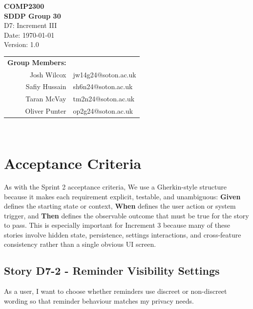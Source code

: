 \documentclass[a4paper, 12pt]{article}
\begin{document}
    \pagestyle{empty}

    \begin{titlepage}
        \centering
        \vspace*{2cm}
        {\Huge \textbf{COMP2300}}\\[1cm]
        {\LARGE \textbf{SDDP Group 30}}\\[0.5cm]
        {\Large D7: Increment III}\\[1cm]
        {\large Date: \today}\\[0.2cm]
        {\large Version: 1.0}\\[1cm]
        \begin{tabular}{rl}
            \textbf{Group Members:} &                     \\
            Josh Wilcox             & jw14g24@soton.ac.uk \\
            Safiy Hussain           & sh6n24@soton.ac.uk  \\
            Taran McVay             & tm2n24@soton.ac.uk  \\
            Oliver Punter           & op2g24@soton.ac.uk  \\
        \end{tabular}
        \\[0.2cm]
        \vfill
    \end{titlepage}

    \section{Acceptance Criteria}

    As with the Sprint 2 acceptance criteria, We use a Gherkin-style structure because
    it makes each requirement explicit, testable, and unambiguous: \textbf{Given}
    defines the starting state or context, \textbf{When} defines the user action
    or system trigger, and \textbf{Then} defines the observable outcome that must
    be true for the story to pass. This is especially important for Increment 3
    because many of these stories involve hidden state, persistence, settings
    interactions, and cross-feature consistency rather than a single obvious UI screen.

    \subsection{Story D7-2 - Reminder Visibility Settings}

    As a user, I want to choose whether reminders use discreet or non-discreet wording
    so that reminder behaviour matches my privacy needs.
\end{document}

